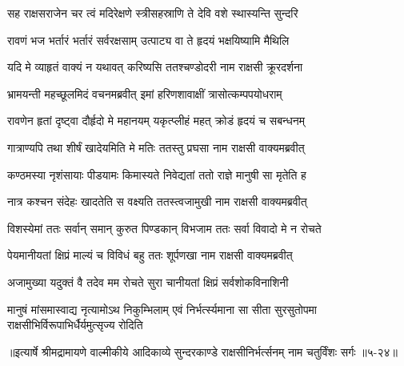 \twolineshloka
{सह राक्षसराजेन चर त्वं मदिरेक्षणे}
{स्त्रीसहस्राणि ते देवि वशे स्थास्यन्ति सुन्दरि} %

\twolineshloka
{रावणं भज भर्तारं भर्तारं सर्वरक्षसाम्}
{उत्पाट्य वा ते हृदयं भक्षयिष्यामि मैथिलि} %

\twolineshloka
{यदि मे व्याहृतं वाक्यं न यथावत् करिष्यसि}
{ततश्चण्डोदरी नाम राक्षसी क्रूरदर्शना} %

\twolineshloka
{भ्रामयन्ती महच्छूलमिदं वचनमब्रवीत्}
{इमां हरिणशावाक्षीं त्रासोत्कम्पपयोधराम्} %

\twolineshloka
{रावणेन हृतां दृष्ट्वा दौर्हृदो मे महानयम्}
{यकृत्प्लीहं महत् क्रोडं हृदयं च सबन्धनम्} %

\twolineshloka
{गात्राण्यपि तथा शीर्षं खादेयमिति मे मतिः}
{ततस्तु प्रघसा नाम राक्षसी वाक्यमब्रवीत्} %

\twolineshloka
{कण्ठमस्या नृशंसायाः पीडयामः किमास्यते}
{निवेद्यतां ततो राज्ञे मानुषी सा मृतेति ह} %

\twolineshloka
{नात्र कश्चन संदेहः खादतेति स वक्ष्यति}
{ततस्त्वजामुखी नाम राक्षसी वाक्यमब्रवीत्} %

\twolineshloka
{विशस्येमां ततः सर्वान् समान् कुरुत पिण्डकान्}
{विभजाम ततः सर्वा विवादो मे न रोचते} %

\twolineshloka
{पेयमानीयतां क्षिप्रं माल्यं च विविधं बहु}
{ततः शूर्पणखा नाम राक्षसी वाक्यमब्रवीत्} %

\twolineshloka
{अजामुख्या यदुक्तं वै तदेव मम रोचते}
{सुरा चानीयतां क्षिप्रं सर्वशोकविनाशिनी} %

\threelineshloka
{मानुषं मांसमास्वाद्य नृत्यामोऽथ निकुम्भिलाम्}
{एवं निर्भर्त्स्यमाना सा सीता सुरसुतोपमा}
{राक्षसीभिर्विरूपाभिर्धैर्यमुत्सृज्य रोदिति} %


॥इत्यार्षे श्रीमद्रामायणे वाल्मीकीये आदिकाव्ये सुन्दरकाण्डे राक्षसीनिर्भर्त्सनम् नाम चतुर्विंशः सर्गः ॥५-२४॥
